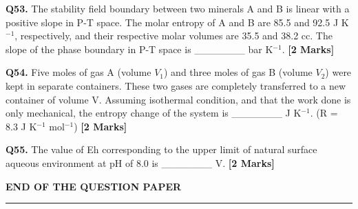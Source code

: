 \documentclass[11pt]{article}
\newcommand{\questionb}[2]{
    \noindent\textbf{Q#2.} #1 \hfill \textbf{[2 Marks]}
}
\begin{document}
\questionb{The stability field boundary between two minerals A and B is linear with a positive slope in P-T space. The molar entropy of A and B are 85.5 and 92.5 J K\(^{-1}\), respectively, and their respective molar volumes are 35.5 and 38.2 cc. The slope of the phase boundary in P-T space is \_\_\_\_\_\_\_ bar K\(^{-1}\).}{53}
\vspace{0.5cm}

\questionb{Five moles of gas A (volume \(V_1\)) and three moles of gas B (volume \(V_2\)) were kept in separate containers. These two gases are completely transferred to a new container of volume V. Assuming isothermal condition, and that the work done is only mechanical, the entropy change of the system is \_\_\_\_\_\_\_ J K\(^{-1}\). (R = 8.3 J K\(^{-1}\) mol\(^{-1}\))}{54}
\vspace{0.5cm}

\questionb{The value of Eh corresponding to the upper limit of natural surface aqueous environment at pH of 8.0 is \_\_\_\_\_\_\_ V.}{55}
\vspace{0.5cm}




\vspace{5cm}
\begin{center}
\textbf{END OF THE QUESTION PAPER} \\
\rule{\textwidth}{0.5pt}
\end{center}
\end{document}
